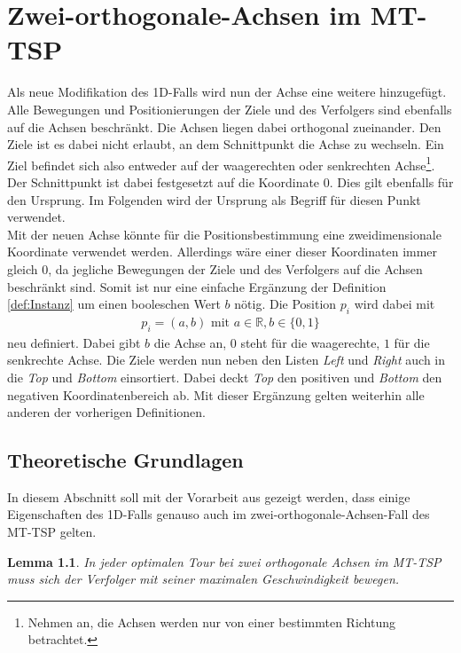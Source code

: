 \documentclass[german,version-2019-11]{uzl-thesis}
\newtheorem{lem}{Lemma}
\begin{document}
\chapter{Zwei-orthogonale-Achsen im MT-TSP}
\label{kap3}
Als neue Modifikation des 1D-Falls wird nun der Achse eine weitere hinzugefügt. Alle Bewegungen und Positionierungen der Ziele und des Verfolgers sind ebenfalls auf die Achsen beschränkt. Die Achsen liegen dabei orthogonal zueinander. Den Ziele ist es dabei nicht erlaubt, an dem Schnittpunkt die Achse zu wechseln. Ein Ziel befindet sich also entweder auf der waagerechten oder senkrechten Achse\footnote{Nehmen an, die Achsen werden nur von einer bestimmten Richtung betrachtet.}. Der Schnittpunkt ist dabei festgesetzt auf die Koordinate $0$. Dies gilt ebenfalls für den Ursprung. Im Folgenden wird der Ursprung als Begriff für diesen Punkt verwendet. \\
Mit der neuen Achse könnte für die Positionsbestimmung eine zweidimensionale Koordinate verwendet werden. Allerdings wäre einer dieser Koordinaten immer gleich $0$, da jegliche Bewegungen der Ziele und des Verfolgers auf die Achsen beschränkt sind. Somit ist nur eine einfache Ergänzung der Definition \ref{def:Instanz} um einen booleschen Wert $b$ nötig. Die Position $p_i$ wird dabei mit 
\begin{align*}
p_i = (a, b) \text{ mit } a\in\mathbb{R}, b\in \{0,1\}
\end{align*}
neu definiert. Dabei gibt $b$ die Achse an, $0$ steht für die waagerechte, $1$ für die senkrechte Achse. Die Ziele werden nun neben den Listen \emph{Left} und \emph{Right} auch in die \emph{Top} und \emph{Bottom} einsortiert. Dabei deckt \emph{Top} den positiven und \emph{Bottom} den negativen Koordinatenbereich ab. Mit dieser Ergänzung gelten weiterhin alle anderen der vorherigen Definitionen.

\section{Theoretische Grundlagen}

In diesem Abschnitt soll mit der Vorarbeit aus \cite{helvig} gezeigt werden, dass einige Eigenschaften des 1D-Falls genauso auch im zwei-orthogonale-Achsen-Fall des MT-TSP gelten.

\begin{lem}
\label{lem:1}
In jeder optimalen Tour bei zwei orthogonale Achsen im MT-TSP muss sich der Verfolger mit seiner  maximalen Geschwindigkeit bewegen.
\end{lem}
 
\end{document}
